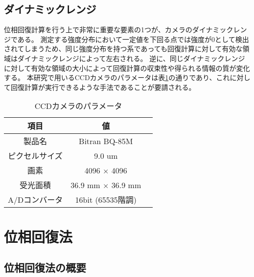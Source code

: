 \subsection{ダイナミックレンジ}
\label{chap3_dynamic_range}

位相回復計算を行う上で非常に重要な要素の1つが、カメラのダイナミックレンジである。
測定する強度分布において一定値を下回る点では強度が0として検出されてしまうため、同じ強度分布を持つ系であっても回復計算に対して有効な領域はダイナミックレンジによって左右される。
逆に、同じダイナミックレンジに対して有効な領域の大小によって回復計算の収束性や得られる情報の質が変化する。
本研究で用いるCCDカメラのパラメータは表\ref{tb:ccd_camera_params}の通りであり、これに対して回復計算が実行できるような手法であることが要請される。

\begin{table}[!ht]
\begin{center}
  \begin{tabular}{|c|c|l|} \hline
    項目 & 値 \\ \hline
    製品名 & Bitran BQ-85M \\
    ピクセルサイズ & 9.0 um \\
    画素 & 4096 $\times$ 4096 \\
    受光面積 & 36.9 mm $\times$ 36.9 mm \\
    A/Dコンバータ & 16bit (65535階調) \\ \hline
  \end{tabular}
  \caption{CCDカメラのパラメータ}
  \label{tb:ccd_camera_params}
\end{center}
\end{table}

\clearpage
\newpage


\section{位相回復法}

\subsection{位相回復法の概要}
\label{chap3_phase_retrieval_introduction}

